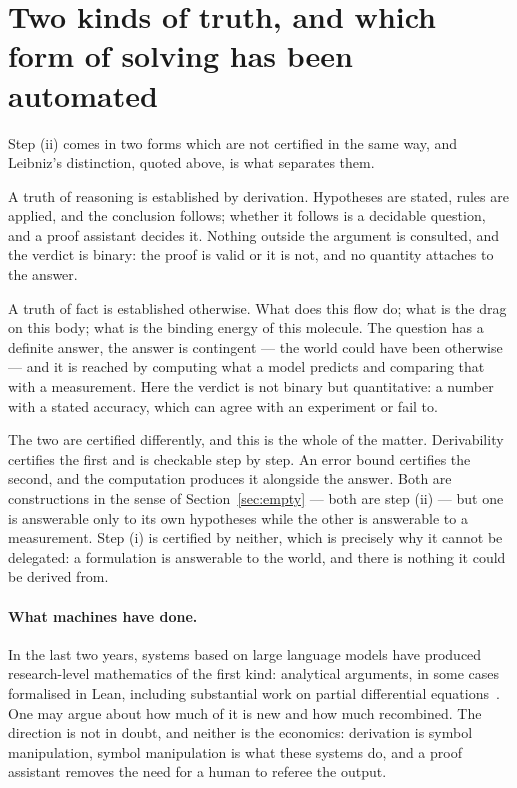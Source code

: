 \documentclass[11pt]{article}
\begin{document}
\section{Two kinds of truth, and which form of solving has been automated}\label{sec:two-truths}

Step (ii) comes in two forms which are not certified in the same way, and Leibniz's distinction,
quoted above, is what separates them.

A truth of reasoning is established by derivation. Hypotheses are stated, rules are applied, and the
conclusion follows; whether it follows is a decidable question, and a proof assistant decides it.
Nothing outside the argument is consulted, and the verdict is binary: the proof is valid or it is
not, and no quantity attaches to the answer.

A truth of fact is established otherwise. What does this flow do; what is the drag on this body;
what is the binding energy of this molecule. The question has a definite answer, the answer is
contingent --- the world could have been otherwise --- and it is reached by computing what a model
predicts and comparing that with a measurement. Here the verdict is not binary but quantitative: a
number with a stated accuracy, which can agree with an experiment or fail to.

The two are certified differently, and this is the whole of the matter. Derivability certifies the
first and is checkable step by step. An error bound certifies the second, and the computation
produces it alongside the answer. Both are constructions in the sense of
Section~\ref{sec:empty} --- both are step (ii) --- but one is answerable only to its own hypotheses
while the other is answerable to a measurement. Step (i) is certified by neither, which is precisely
why it cannot be delegated: a formulation is answerable to the world, and there is nothing it could
be derived from.

\paragraph{What machines have done.} In the last two years, systems based on large language models
have produced research-level mathematics of the first kind: analytical arguments, in some cases
formalised in Lean, including substantial work on partial differential
equations~\cite{openaiNS,openaiEuler}. One may argue about how much of it is new and how much
recombined. The direction is not in doubt, and neither is the economics: derivation is symbol
manipulation, symbol manipulation is what these systems do, and a proof assistant removes the need
for a human to referee the output.
\end{document}
